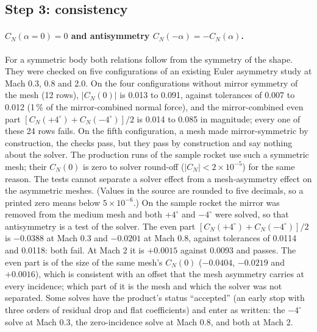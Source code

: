 \documentclass[11pt,a4paper]{article}
\begin{document}
\subsection{Step 3: consistency}
\label{sec:consistency}

\paragraph{$C_N(\alpha=0)=0$ and antisymmetry $C_N(-\alpha)=-C_N(\alpha)$.}
For a symmetric body both relations follow from the symmetry of the shape.
They were checked on five configurations of an existing Euler asymmetry study at Mach 0.3, 0.8 and 2.0.
On the four configurations without mirror symmetry of the mesh (12 rows), $|C_N(0)|$ is 0.013 to 0.091, against
tolerances of 0.007 to 0.012 (1\,\% of the mirror-combined normal force), and the mirror-combined even part
$[C_N(+4^\circ)+C_N(-4^\circ)]/2$ is 0.014 to 0.085 in magnitude; every one of these 24 rows fails.
On the fifth configuration, a mesh made mirror-symmetric by construction, the checks pass, but they pass by construction
and say nothing about the solver.
The production runs of the sample rocket use such a symmetric mesh; their $C_N(0)$ is zero to solver round-off
($|C_N|<2\times10^{-5}$) for the same reason.
The tests cannot separate a solver effect from a mesh-asymmetry effect on the asymmetric meshes.
(Values in the source are rounded to five decimals, so a printed zero means below $5\times10^{-6}$.)
On the sample rocket the mirror was removed from the medium mesh and both $+4^\circ$ and $-4^\circ$ were solved, so that antisymmetry is a test of the solver.
The even part $[C_N(+4^\circ)+C_N(-4^\circ)]/2$ is $-0.0388$ at Mach 0.3 and $-0.0201$ at Mach 0.8, against tolerances of 0.0114 and 0.0118: both fail.
At Mach 2 it is $+0.0015$ against 0.0093 and passes.
The even part is of the size of the same mesh's $C_N(0)$ ($-0.0404$, $-0.0219$ and $+0.0016$), which is consistent with an offset that the mesh asymmetry carries at every incidence;
which part of it is the mesh and which the solver was not separated.
Some solves have the product's status ``accepted'' (an early stop with three orders of residual drop and flat coefficients) and enter as written: the $-4^\circ$ solve at Mach 0.3, the zero-incidence solve at Mach 0.8, and both at Mach 2.
\end{document}
